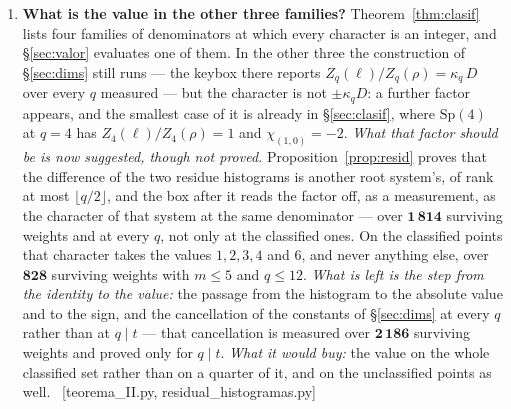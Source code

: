 \documentclass[11pt,a4paper]{article}
\theoremstyle{definition}
\newcommand{\Sp}{\mathrm{Sp}}
\newcommand{\ver}[1]{\unskip\penalty0\ \textcolor{azul}{\small\textsf{[#1]}}}
\begin{document}
\begin{enumerate}\itemsep5pt

\item \textbf{What is the value in the other three families?}
Theorem~\ref{thm:clasif} lists four families of denominators at which every character is an
integer, and \S\ref{sec:valor} evaluates one of them. In the other three the construction of
\S\ref{sec:dims} still runs --- the keybox there reports $Z_q(\ell)/Z_q(\rho)=\kappa_q\,D$ over
every $q$ measured --- but the character is not $\pm\kappa_q D$: a further factor appears, and
the smallest case of it is already in \S\ref{sec:clasif}, where $\Sp(4)$ at $q=4$ has
$Z_4(\ell)/Z_4(\rho)=1$ and $\chi_{(1,0)}=-2$. \emph{What that factor should be is now suggested,
though not proved.} Proposition~\ref{prop:resid} proves that the difference of the two residue
histograms is another root system's, of rank at most $\lfloor q/2\rfloor$, and the box after it
reads the factor off, as a measurement, as the character of that system at the same denominator ---
over $\mathbf{1\,814}$ surviving weights
and at every $q$, not only at the classified ones. On the classified points that character takes
the values $1,2,3,4$ and $6$, and never anything else, over $\mathbf{828}$ surviving weights with
$m\le5$ and $q\le12$. \emph{What is left is the step from the identity to the value:} the passage
from the histogram to the absolute value and to the sign, and the cancellation of the constants of
\S\ref{sec:dims} at every $q$ rather than at $q\mid t$ --- that cancellation is measured over
$\mathbf{2\,186}$ surviving weights and proved only for $q\mid t$. \emph{What it would buy:} the
value on the whole classified set rather than on a quarter of it, and on the unclassified points
as well. \ver{teorema\_II.py, residual\_histogramas.py}


\end{enumerate}
\end{document}

